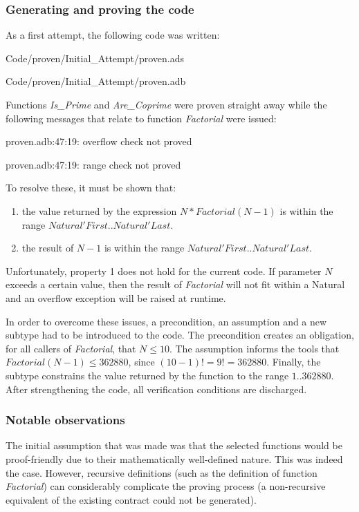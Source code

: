 \documentclass{llncs} \usepackage[utf8]{inputenc} \usepackage{url}
\begin{document}
\subsubsection{Generating and proving the code}
As a first attempt, the following code was written:

{Code/proven/Initial_Attempt/proven.ads}

{Code/proven/Initial_Attempt/proven.adb}

Functions \emph{Is\_Prime} and \emph{Are\_Coprime} were proven
straight away while the following messages that relate to function
\emph{Factorial} were issued:

proven.adb:47:19: overflow check not proved

proven.adb:47:19: range check not proved

\noindent
To resolve these, it must be shown that:
\begin{enumerate}
\item the value returned by the expression $N * Factorial (N - 1)$ is
  within the range $Natural'First .. Natural'Last$.

\item the result of $N - 1$ is within the range $Natural'First
  .. Natural'Last$.
\end{enumerate}
Unfortunately, property 1 does not hold for the current code. If
parameter $N$ exceeds a certain value, then the result of
\emph{Factorial} will not fit within a Natural and an overflow
exception will be raised at runtime.

In order to overcome these issues, a precondition, an assumption and a
new subtype had to be introduced to the code. The precondition creates
an obligation, for all callers of \emph{Factorial}, that $N \leq
10$. The assumption informs the tools that $Factorial (N - 1) \leq
362880$, since $(10 - 1)! = 9! = 362880$. Finally, the subtype
constrains the value returned by the function to the range $1
.. 362880$. After strengthening the code, all verification conditions
are discharged.




\subsubsection{Notable observations}
The initial assumption that was made was that the selected functions
would be proof-friendly due to their mathematically well-defined
nature. This was indeed the case. However, recursive definitions (such
as the definition of function \emph{Factorial}) can considerably
complicate the proving process (a non-recursive equivalent of the
existing contract could not be generated).
\end{document}
